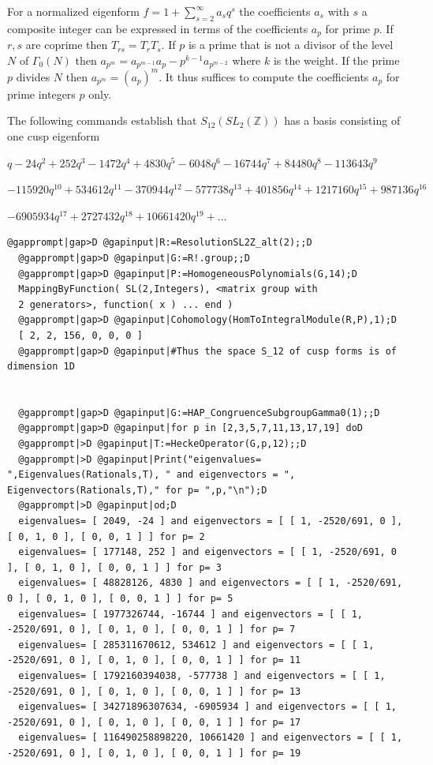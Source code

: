 \documentclass[a4paper,11pt]{report}
\begin{document}
{{\begin{Verbatim}[commandchars=!@|,fontsize=\small,frame=single,label=Example]
\end{Verbatim}
 

 For a normalized eigenform $f=1 + \sum_{s=2}^\infty a_sq^s$ the coefficients $a_s$ with $s$ a composite integer can be expressed in terms of the coefficients $a_p$ for prime $p$. If $r,s$ are coprime then $T_{rs} =T_rT_s$. If $p$ is a prime that is not a divisor of the level $N$ of $\Gamma_0(N)$ then $a_{p^m} =a_{p^{m-1}}a_p - p^{k-1} a_{p^{m-2}}$ where $k$ is the weight. If the prime $ p$ divides $N$ then $a_{p^m} = (a_p)^m$. It thus suffices to compute the coefficients $a_p$ for prime integers $p$ only. 

 The following commands establish that $S_{12}(SL_2(\mathbb Z))$ has a basis consisting of one cusp eigenform 

$q - 24q^2 + 252q^3 - 1472q^4 + 4830q^5 - 6048q^6 - 16744q^7 + 84480q^8 -
113643q^9 $ 

$- 115920q^{10} + 534612q^{11} - 370944q^{12} - 577738q^{13} + 401856q^{14} +
1217160q^{15} + 987136q^{16}$ 

$ - 6905934q^{17} + 2727432q^{18} + 10661420q^{19} + ...$ 
\begin{Verbatim}[commandchars=@|D,fontsize=\small,frame=single,label=Example]
  @gapprompt|gap>D @gapinput|R:=ResolutionSL2Z_alt(2);;D
  @gapprompt|gap>D @gapinput|G:=R!.group;;D
  @gapprompt|gap>D @gapinput|P:=HomogeneousPolynomials(G,14);D
  MappingByFunction( SL(2,Integers), <matrix group with 
  2 generators>, function( x ) ... end )
  @gapprompt|gap>D @gapinput|Cohomology(HomToIntegralModule(R,P),1);D
  [ 2, 2, 156, 0, 0, 0 ]
  @gapprompt|gap>D @gapinput|#Thus the space S_12 of cusp forms is of dimension 1D
  
  
  @gapprompt|gap>D @gapinput|G:=HAP_CongruenceSubgroupGamma0(1);;D
  @gapprompt|gap>D @gapinput|for p in [2,3,5,7,11,13,17,19] doD
  @gapprompt|>D @gapinput|T:=HeckeOperator(G,p,12);;D
  @gapprompt|>D @gapinput|Print("eigenvalues= ",Eigenvalues(Rationals,T), " and eigenvectors = ", Eigenvectors(Rationals,T)," for p= ",p,"\n");D
  @gapprompt|>D @gapinput|od;D
  eigenvalues= [ 2049, -24 ] and eigenvectors = [ [ 1, -2520/691, 0 ], [ 0, 1, 0 ], [ 0, 0, 1 ] ] for p= 2
  eigenvalues= [ 177148, 252 ] and eigenvectors = [ [ 1, -2520/691, 0 ], [ 0, 1, 0 ], [ 0, 0, 1 ] ] for p= 3
  eigenvalues= [ 48828126, 4830 ] and eigenvectors = [ [ 1, -2520/691, 0 ], [ 0, 1, 0 ], [ 0, 0, 1 ] ] for p= 5
  eigenvalues= [ 1977326744, -16744 ] and eigenvectors = [ [ 1, -2520/691, 0 ], [ 0, 1, 0 ], [ 0, 0, 1 ] ] for p= 7
  eigenvalues= [ 285311670612, 534612 ] and eigenvectors = [ [ 1, -2520/691, 0 ], [ 0, 1, 0 ], [ 0, 0, 1 ] ] for p= 11
  eigenvalues= [ 1792160394038, -577738 ] and eigenvectors = [ [ 1, -2520/691, 0 ], [ 0, 1, 0 ], [ 0, 0, 1 ] ] for p= 13
  eigenvalues= [ 34271896307634, -6905934 ] and eigenvectors = [ [ 1, -2520/691, 0 ], [ 0, 1, 0 ], [ 0, 0, 1 ] ] for p= 17
  eigenvalues= [ 116490258898220, 10661420 ] and eigenvectors = [ [ 1, -2520/691, 0 ], [ 0, 1, 0 ], [ 0, 0, 1 ] ] for p= 19
  

\end{Verbatim}}}
\end{document}
